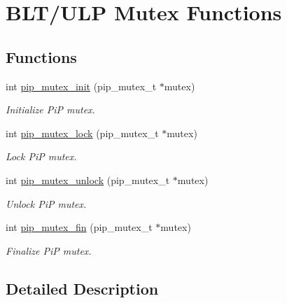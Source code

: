 \hypertarget{group__ULP-5-mutex}{\section{B\-L\-T/\-U\-L\-P Mutex Functions}
\label{group__ULP-5-mutex}
}
\subsection*{Functions}
\begin{DoxyCompactItemize}
\item 
int \hyperlink{group__ULP-5-mutex_gaff168395426838d385ad6720c9fb4184}{pip\-\_\-mutex\-\_\-init} (pip\-\_\-mutex\-\_\-t $\ast$mutex)
\begin{DoxyCompactList}\small\item\em Initialize Pi\-P mutex. \end{DoxyCompactList}\item 
int \hyperlink{group__ULP-5-mutex_ga14f77d2413590f58d7a45a3b56960c90}{pip\-\_\-mutex\-\_\-lock} (pip\-\_\-mutex\-\_\-t $\ast$mutex)
\begin{DoxyCompactList}\small\item\em Lock Pi\-P mutex. \end{DoxyCompactList}\item 
int \hyperlink{group__ULP-5-mutex_ga370bb79d84360fdb96169fc5cea789ee}{pip\-\_\-mutex\-\_\-unlock} (pip\-\_\-mutex\-\_\-t $\ast$mutex)
\begin{DoxyCompactList}\small\item\em Unlock Pi\-P mutex. \end{DoxyCompactList}\item 
int \hyperlink{group__ULP-5-mutex_ga884fae0413bd07dbdb5f3940129b7b20}{pip\-\_\-mutex\-\_\-fin} (pip\-\_\-mutex\-\_\-t $\ast$mutex)
\begin{DoxyCompactList}\small\item\em Finalize Pi\-P mutex. \end{DoxyCompactList}\end{DoxyCompactItemize}


\subsection{Detailed Description}


